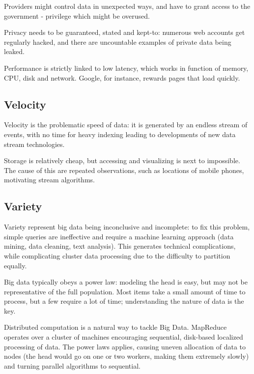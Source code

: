 Providers might control data in unexpected ways, and have to grant access to the government - privilege which might be overused.

Privacy needs to be guaranteed, stated and kept-to: numerous web accounts get regularly hacked, and there are uncountable examples of private data being leaked. 

Performance is strictly linked to low latency, which works in function of memory, CPU, disk and network. Google, for instance, rewards pages that load quickly. 

\subsection{Velocity}
Velocity is the problematic speed of data: it is generated by an endless stream of events, with no time for heavy indexing leading to developments of new data stream technologies. 

Storage is relatively cheap, but accessing and visualizing is next to impossible. The cause of this are repeated observations, such as locations of mobile phones, motivating stream algorithms. 

\subsection{Variety}
Variety represent big data being inconclusive and incomplete: to fix this problem, simple queries are ineffective and require a machine learning approach (data mining, data cleaning, text analysis). This generates technical complications, while complicating cluster data processing due to the difficulty to partition equally.

Big data typically obeys a power law: modeling the head is easy, but may not be representative of the full population. Most items take a small amount of time to process, but a few require a lot of time; understanding the nature of data is the key. 

Distributed computation is a natural way to tackle Big Data. MapReduce operates over a cluster of machines encouraging sequential, disk-based localized processing of data. The power laws applies, causing uneven allocation of data to nodes (the head would go on one or two workers, making them extremely slowly) and turning parallel algorithms to sequential. 

